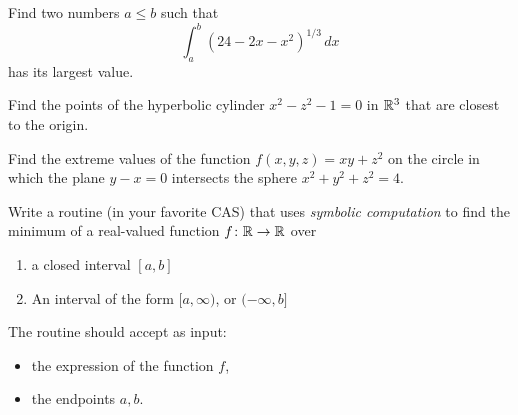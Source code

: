 \begin{problem}[Basic]
Find two numbers $a \leq b$ such that 
\begin{equation*}
\int_a^b (24-2x-x^2)^{1/3}\, dx
\end{equation*}
has its largest value.
\end{problem}

\begin{problem}[Intermediate] %
Find the points of the hyperbolic cylinder $x^2-z^2-1=0$ in $\mathbb{R}^3$ that are closest to the origin.
\end{problem}

\begin{problem}[Intermediate]
Find the extreme values of the function $f(x,y,z)=xy+z^2$ on the circle in which the plane $y-x=0$ intersects the sphere $x^2+y^2+z^2=4$.
\end{problem}

\begin{problem}[CAS]
Write a routine (in your favorite CAS) that uses \emph{symbolic computation} to find the minimum of a real-valued function $f \colon \mathbb{R} \to \mathbb{R}$ over 
\begin{enumerate}
	\item a closed interval $[a,b]$
	\item An interval of the form $[a,\infty)$, or $(-\infty, b]$
\end{enumerate}
The routine should accept as input:
\begin{itemize}
	\item the expression of the function $f$,
	\item the endpoints $a,b$.
\end{itemize}
\end{problem}